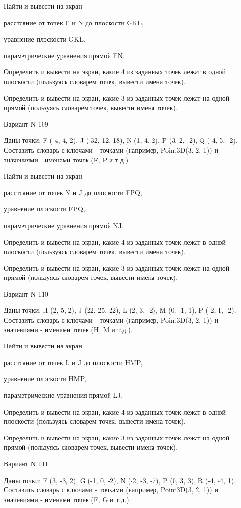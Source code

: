 \documentclass[11pt]{report}
\begin{document}
 
Найти и вывести на экран


расстояние от точек F и N до плоскости GKL,

 
уравнение плоскости GKL,

 
параметрические уравнения прямой FN.


Определить и вывести на экран, какие 4 из заданных точек лежат в одной плоскости (пользуясь словарем точек, вывести имена точек).


Определить и вывести на экран, какие 3 из заданных точек лежат на одной прямой (пользуясь словарем точек, вывести имена точек).

Вариант N 109

Даны точки: F (-4, 4, 2), J (-32, 12, 18), N (1, 4, 2), P (3, 2, -2), Q (-4, 5, -2).
Составить словарь с ключами - точками (например, Point3D(3, 2, 1)) и значениями - именами точек (F, P и т.д.).

 
Найти и вывести на экран


расстояние от точек N и J до плоскости FPQ,

 
уравнение плоскости FPQ,

 
параметрические уравнения прямой NJ.


Определить и вывести на экран, какие 4 из заданных точек лежат в одной плоскости (пользуясь словарем точек, вывести имена точек).


Определить и вывести на экран, какие 3 из заданных точек лежат на одной прямой (пользуясь словарем точек, вывести имена точек).

Вариант N 110

Даны точки: H (2, 5, 2), J (22, 25, 22), L (2, 3, -2), M (0, -1, 1), P (-2, 1, -2).
Составить словарь с ключами - точками (например, Point3D(3, 2, 1)) и значениями - именами точек (H, M и т.д.).

 
Найти и вывести на экран


расстояние от точек L и J до плоскости HMP,

 
уравнение плоскости HMP,

 
параметрические уравнения прямой LJ.


Определить и вывести на экран, какие 4 из заданных точек лежат в одной плоскости (пользуясь словарем точек, вывести имена точек).


Определить и вывести на экран, какие 3 из заданных точек лежат на одной прямой (пользуясь словарем точек, вывести имена точек).

Вариант N 111

Даны точки: F (3, -3, 2), G (-1, 0, -2), N (-2, -3, -7), P (0, 3, 3), R (-4, -4, 1).
Составить словарь с ключами - точками (например, Point3D(3, 2, 1)) и значениями - именами точек (F, G и т.д.).
\end{document}
